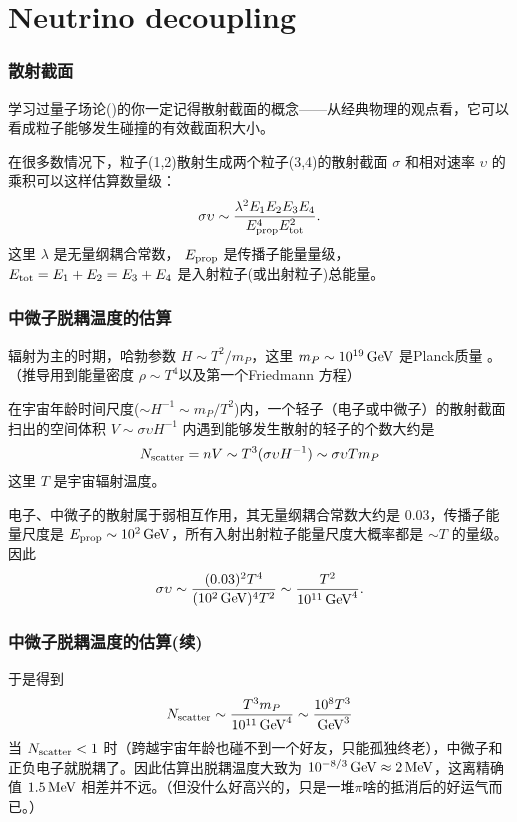\documentclass[CJK,13pt]{beamer}
\date{}
\begin{document}
  \bch

  \section{Neutrino decoupling}


  \begin{frame}
    \frametitle{散射截面}
    学习过量子场论()的你一定记得散射截面的概念——从经典物理的观点看，它可以看成粒子能够发生碰撞的有效截面积大小。

    \skiplines
    
    在很多数情况下，粒子(1,2)散射生成两个粒子(3,4)的散射截面 $\sigma$ 和相对速率 $\upsilon$ 的乘积可以这样估算数量级：
    {\blue $$\sigma \upsilon \sim \frac{\lambda^2E_1E_2E_3E_4}{E_{\rm prop}^4E^2_{\rm tot}}.$$}
    这里 $\lambda$ 是无量纲耦合常数， $E_{\rm prop}$ 是传播子能量量级，$E_{\rm tot}=E_1+E_2=E_3+E_4$ 是入射粒子(或出射粒子)总能量。
  \end{frame}


  \begin{frame}
    \frametitle{中微子脱耦温度的估算}
    辐射为主的时期，哈勃参数 $H \sim T^2/m_P$，这里 $m_P\sim 10^{19}\,\mathrm{GeV}$ 是Planck质量 。（推导用到能量密度 $\rho \sim T^4$以及第一个Friedmann 方程）


    在宇宙年龄时间尺度($\sim H^{-1}\sim m_P/T^2$)内，一个轻子（电子或中微子）的散射截面扫出的空间体积 $V \sim \sigma \upsilon H^{-1}$ 内遇到能够发生散射的轻子的个数大约是
    $$N_{\rm scatter} = nV \sim T^3  (\sigma \upsilon H^{-1}) \sim \sigma \upsilon T m_P$$
    这里 $T$ 是宇宙辐射温度。
    
    电子、中微子的散射属于弱相互作用，其无量纲耦合常数大约是 $0.03$，传播子能量尺度是 $E_{\rm prop}\sim 10^2\,\mathrm{GeV}$，所有入射出射粒子能量尺度大概率都是 $\sim T$ 的量级。因此
    $$\sigma \upsilon \sim \frac{(0.03)^2 T^4}{ (10^2\,\mathrm{GeV})^4T^2} \sim \frac{T^2}{10^{11}\,\mathrm{GeV}^4}.$$
    
  \end{frame}


    \begin{frame}
    \frametitle{中微子脱耦温度的估算(续)}
    于是得到
    $$ N_{\rm scatter} \sim \frac{T^3m_P}{10^{11}\,\mathrm{GeV}^4} \sim \frac{10^8T^3}{\,\mathrm{GeV}^3} $$
    当 $N_{\rm scatter}< 1$ 时（跨越宇宙年龄也碰不到一个好友，只能孤独终老），中微子和正负电子就脱耦了。因此估算出脱耦温度大致为 $10^{-8/3}\,\mathrm{GeV} \approx 2\,\mathrm{MeV}$，这离精确值 $1.5\,\mathrm{MeV}$ 相差并不远。（但没什么好高兴的，只是一堆$\pi$啥的抵消后的好运气而已。）
  \end{frame}
\end{document}
